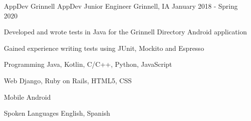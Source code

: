 \documentclass[12pt, a4paper]{awesome-cv}
\begin{document}
\begin{cventries}
  \cventry
    {AppDev Grinnell}
    {AppDev Junior Engineer}
    {Grinnell, IA}
    {January 2018 - Spring 2020}
    {
      \begin{cvitems}
        \item {Developed and wrote tests in Java for the Grinnell Directory Android application}
	    \item {Gained experience writing tests using JUnit, Mockito and Espresso}
      \end{cvitems}
    }

\end{cventries}


\begin{cvskills}
  \cvskill
    {Programming} 
    {Java, Kotlin, C/C++, Python, JavaScript} 

  \cvskill
    {Web} 
    {Django, Ruby on Rails, HTML5, CSS} 

  \cvskill
    {Mobile}
    {Android}

  \cvskill
    {Spoken Languages} 
    {English, Spanish} 

\end{cvskills}
\end{document}
